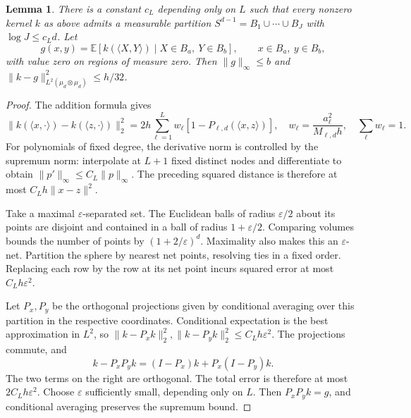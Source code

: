 \documentclass[11pt,reqno]{amsart}
\numberwithin{equation}{section}
\newtheorem{lemma}[theorem]{Lemma}
\theoremstyle{definition}
\theoremstyle{remark}
\theoremstyle{definition}
\begin{document}
\begin{lemma}\label{lem:partition}
There is a constant $c_L$ depending only on $L$ such that every nonzero kernel $k$ as above admits a measurable partition
$S^{d-1}=B_1\cup\cdots\cup B_J$ with $\log J\le c_Ld$.
Let
\[
 g(x,y)=\mathbb E[k(\langle X,Y\rangle)\mid X\in B_a,\ Y\in B_b],
 \qquad x\in B_a,\ y\in B_b,
\]
with value zero on regions of measure zero. Then
$\|g\|_\infty\le b$ and $\|k-g\|_{L^2(\mu_d\otimes\mu_d)}^2\le h/32$.
\end{lemma}
\begin{proof}
The addition formula gives
\[
 \|k(\langle x,\cdot\rangle)-k(\langle z,\cdot\rangle)\|_2^2
 =2h\sum_{\ell=1}^L w_\ell[1-P_{\ell,d}(\langle x,z\rangle)],
 \quad w_\ell=\frac{a_\ell^2}{M_{\ell,d}h},\quad \sum_\ell w_\ell=1.
\]
For polynomials of fixed degree, the derivative norm is controlled by the supremum norm:
interpolate at $L+1$ fixed distinct nodes and differentiate to obtain
$\|p'\|_\infty\le C_L\|p\|_\infty$.
The preceding squared distance is therefore at most $C_Lh\|x-z\|^2$.

Take a maximal $\varepsilon$-separated set. The Euclidean balls of radius $\varepsilon/2$ about its points are disjoint
and contained in a ball of radius $1+\varepsilon/2$. Comparing volumes bounds the number of points by
$(1+2/\varepsilon)^d$. Maximality also makes this an $\varepsilon$-net.
Partition the sphere by nearest net points, resolving ties in a fixed order.
Replacing each row by the row at its net point incurs squared error at most $C_Lh\varepsilon^2$.

Let $P_x,P_y$ be the orthogonal projections given by conditional averaging over this partition in the respective coordinates.
Conditional expectation is the best approximation in $L^2$, so
$\|k-P_xk\|_2^2,\|k-P_yk\|_2^2\le C_Lh\varepsilon^2$.
The projections commute, and
\[
 k-P_xP_yk=(I-P_x)k+P_x(I-P_y)k.
\]
The two terms on the right are orthogonal. The total error is therefore at most $2C_Lh\varepsilon^2$.
Choose $\varepsilon$ sufficiently small, depending only on $L$.
Then $P_xP_yk=g$, and conditional averaging preserves the supremum bound.
\end{proof}
\end{document}
